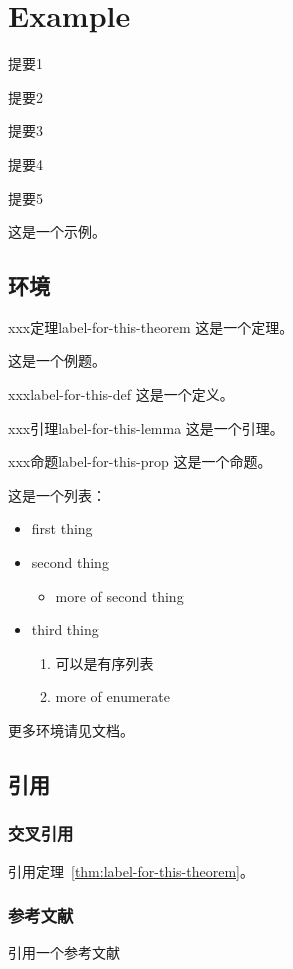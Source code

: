 \chapter{Example}

\begin{introduction}
\item 提要1
\item 提要2
\item 提要3
\item 提要4
\item 提要5
\end{introduction}

这是一个示例。

\section{环境}

\begin{theorem}{xxx定理}{label-for-this-theorem}
  这是一个定理。
\end{theorem}

\begin{example}
  这是一个例题。
\end{example}

\begin{definition}{xxx}{label-for-this-def}
  这是一个定义。
\end{definition}

\begin{lemma}{xxx引理}{label-for-this-lemma}
  这是一个引理。
\end{lemma}

\begin{proposition}{xxx命题}{label-for-this-prop}
  这是一个命题。
\end{proposition}

这是一个列表：

\begin{itemize}
  \item first thing
  \item second thing
    \begin{itemize}
      \item more of second thing
    \end{itemize}
  \item third thing
    \begin{enumerate}
      \item 可以是有序列表
      \item more of enumerate
    \end{enumerate}
\end{itemize}

更多环境请见文档。

\section{引用}

\subsection{交叉引用}

引用定理~\ref{thm:label-for-this-theorem}。

\subsection{参考文献}

引用一个参考文献~\cite{cormen2009introduction}
